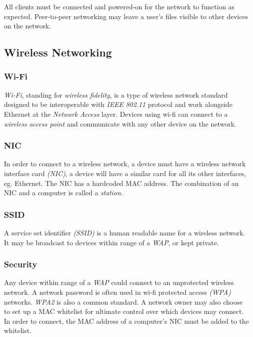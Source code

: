 \documentclass[10pt]{article}
\begin{document}
All clients must be connected and powered-on for the network to function as expected. Peer-to-peer networking may leave a user's files visible to other devices on the network.

\subsection{Wireless Networking}
\label{sec:org3d62070}
\subsubsection{Wi-Fi}
\label{sec:org595b34b}

\emph{Wi-Fi}, standing for \emph{wireless fidelity}, is a type of wireless network standard designed to be interoperable with \emph{IEEE 802.11} protocol and work alongside Ethernet at the \emph{Network Access} layer. Devices using wi-fi can connect to a \emph{wireless access point} and communicate with any other device on the network.

\subsubsection{NIC}
\label{sec:org6306217}

In order to connect to a wireless network, a device must have a wireless network interface card \emph{(NIC)}, a device will have a similar card for all its other interfaces, eg. Ethernet. The NIC has a hardcoded MAC address. The combination of an NIC and a computer is called a \emph{station}.

\subsubsection{SSID}
\label{sec:org6ed90ea}

A service set identifier \emph{(SSID)} is a human readable name for a wireless network. It may be broadcast to devices within range of a \emph{WAP}, or kept private.

\subsubsection{Security}
\label{sec:org978f658}

Any device within range of a \emph{WAP} could connect to an unprotected wireless network. A network password is often used in wi-fi protected access \emph{(WPA)} networks. \emph{WPA2} is also a common standard. A network owner may also choose to set up a MAC whitelist for ultimate control over which devices may connect. In order to connect, the MAC address of a computer's NIC must be added to the whitelist.
\end{document}

